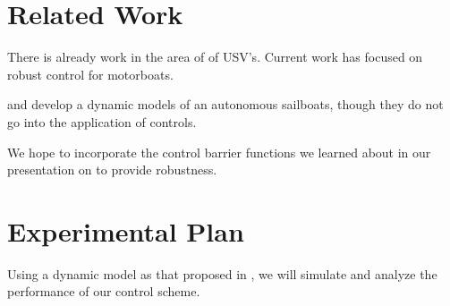 \documentclass[conference]{IEEEtran}
\begin{document}
\section{Related Work}
There is already work in the area of of USV's. Current work has focused on robust control for motorboats.

\cite{Setiawan2020} and \cite{Buehler2018} develop a dynamic models of an autonomous sailboats, though they do not go into the application of controls.

We hope to incorporate the control barrier functions we learned about in our presentation on \cite{Ames2019} to provide robustness.


\section{Experimental Plan}
Using a dynamic model as that proposed in \cite{Buehler2018}, we will simulate and analyze the performance of our control scheme.



\end{document}
